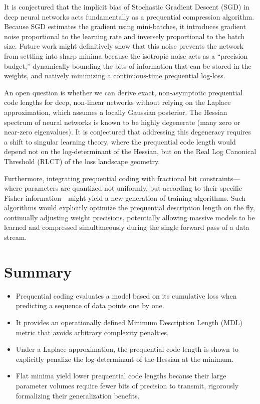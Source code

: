 \begin{horizon}
It is conjectured that the implicit bias of Stochastic Gradient Descent (SGD) in deep neural networks acts fundamentally as a prequential compression algorithm. Because SGD estimates the gradient using mini-batches, it introduces gradient noise proportional to the learning rate and inversely proportional to the batch size. Future work might definitively show that this noise prevents the network from settling into sharp minima because the isotropic noise acts as a ``precision budget,'' dynamically bounding the bits of information that can be stored in the weights, and natively minimizing a continuous-time prequential log-loss.

An open question is whether we can derive exact, non-asymptotic prequential code lengths for deep, non-linear networks without relying on the Laplace approximation, which assumes a locally Gaussian posterior. The Hessian spectrum of neural networks is known to be highly degenerate (many zero or near-zero eigenvalues). It is conjectured that addressing this degeneracy requires a shift to singular learning theory, where the prequential code length would depend not on the log-determinant of the Hessian, but on the Real Log Canonical Threshold (RLCT) of the loss landscape geometry.

Furthermore, integrating prequential coding with fractional bit constraints---where parameters are quantized not uniformly, but according to their specific Fisher information---might yield a new generation of training algorithms. Such algorithms would explicitly optimize the prequential description length on the fly, continually adjusting weight precisions, potentially allowing massive models to be learned and compressed simultaneously during the single forward pass of a data stream.
\end{horizon}

\section{Summary}
\begin{itemize}
    \item Prequential coding evaluates a model based on its cumulative loss when predicting a sequence of data points one by one.
    \item It provides an operationally defined Minimum Description Length (MDL) metric that avoids arbitrary complexity penalties.
    \item Under a Laplace approximation, the prequential code length is shown to explicitly penalize the log-determinant of the Hessian at the minimum.
    \item Flat minima yield lower prequential code lengths because their large parameter volumes require fewer bits of precision to transmit, rigorously formalizing their generalization benefits.
\end{itemize}

